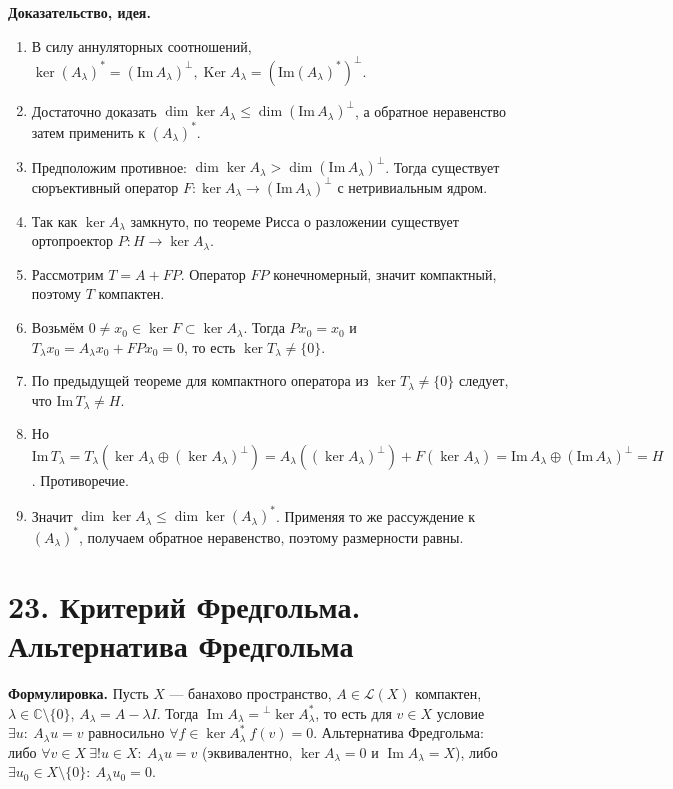 \documentclass[10pt,a4paper]{article}
\newcommand{\Ker}{\operatorname{Ker}}
\begin{document}
	\textbf{Доказательство, идея.}
	\begin{enumerate}
		\item В силу аннуляторных соотношений, $\ker(A_\lambda)^*=(\text{Im}\,A_\lambda)^\perp, \Ker A_{\lambda} = (\text{Im}(A_{\lambda})^*)^\perp$.

		\item Достаточно доказать $\dim\ker A_\lambda\le \dim(\text{Im}\,A_\lambda)^\perp$, а обратное неравенство затем применить к $(A_\lambda)^*$.

		\item Предположим противное: $\dim\ker A_\lambda>\dim(\text{Im}\,A_\lambda)^\perp$. Тогда существует сюръективный оператор $F:\ker A_\lambda\to(\text{Im}\,A_\lambda)^\perp$ с нетривиальным ядром.

		\item Так как $\ker A_\lambda$ замкнуто, по теореме Рисса о разложении существует ортопроектор $P:H\to\ker A_\lambda$.

		\item Рассмотрим $T=A+FP$. Оператор $FP$ конечномерный, значит компактный, поэтому $T$ компактен.

		\item Возьмём $0\ne x_0\in\ker F\subset\ker A_\lambda$. Тогда $Px_0=x_0$ и $T_\lambda x_0=A_\lambda x_0+FPx_0=0$, то есть $\ker T_\lambda\ne\{0\}$.

		\item По предыдущей теореме для компактного оператора из $\ker T_\lambda\ne\{0\}$ следует, что $\text{Im}\,T_\lambda\ne H$.

		\item Но $\text{Im}\,T_\lambda=T_\lambda(\ker A_\lambda\oplus(\ker A_\lambda)^\perp)=A_\lambda((\ker A_\lambda)^\perp)+F(\ker A_\lambda)=\text{Im}\,A_\lambda\oplus(\text{Im}\,A_\lambda)^\perp=H$. Противоречие.

		\item Значит $\dim\ker A_\lambda\le\dim\ker(A_\lambda)^*$. Применяя то же рассуждение к $(A_\lambda)^*$, получаем обратное неравенство, поэтому размерности равны.
	\end{enumerate}

	\section*{23. Критерий Фредгольма. Альтернатива Фредгольма}
	\textbf{Формулировка.} Пусть $X$ --- банахово пространство, $A\in\mathcal L(X)$ компактен, $\lambda\in\mathbb C\setminus\{0\}$, $A_\lambda=A-\lambda I$. Тогда $\operatorname{Im}A_\lambda={}^{\perp}\ker A_\lambda^*$, то есть для $v\in X$ условие $\exists u:\ A_\lambda u=v$ равносильно $\forall f\in\ker A_\lambda^*\ f(v)=0$. \newline Альтернатива Фредгольма: либо $\forall v\in X\ \exists!u\in X:\ A_\lambda u=v$ (эквивалентно, $\ker A_\lambda=0$ и $\operatorname{Im}A_\lambda=X$), либо $\exists u_0\in X\setminus\{0\}:\ A_\lambda u_0=0$.
\end{document}
